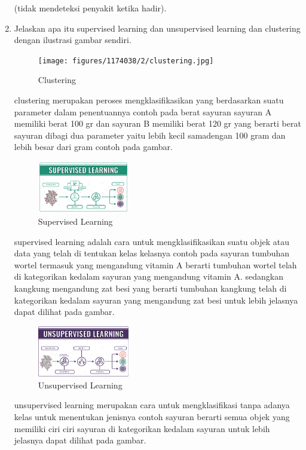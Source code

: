 \begin{enumerate}
	(tidak mendeteksi penyakit ketika hadir).
	\item Jelaskan apa itu supervised learning dan unsupervised learning dan clustering dengan ilustrasi gambar sendiri.
	\hfill\break
	\begin{figure}[H]
		\texttt{[image: figures/1174038/2/clustering.jpg]}
		\centering
		\caption{Clustering}
	\end{figure}
	\hfill\break
	clustering merupakan peroses mengklasifikasikan yang berdasarkan suatu parameter dalam penentuannya contoh pada berat sayuran sayuran A memiliki berat 100 gr dan sayuran B memiliki berat 120 gr yang berarti berat sayuran dibagi dua parameter yaitu lebih kecil samadengan 100 gram dan lebih besar dari gram contoh pada gambar.\par
		\begin{figure}[H]
		\includegraphics[width=4cm]{figures/1174038/2/supervised.png}
		\centering
		\caption{Supervised Learning}
	\end{figure}
	\hfill\break
	supervised learning adalah cara untuk mengklasifikasikan suatu objek atau data yang telah di tentukan kelas kelasnya contoh pada sayuran tumbuhan wortel termasuk yang mengandung vitamin A berarti tumbuhan wortel telah di kategorikan kedalam sayuran yang mengandung vitamin A. sedangkan kangkung mengandung zat besi yang berarti tumbuhan kangkung telah di kategorikan kedalam sayuran yang mengandung zat besi untuk lebih jelasnya dapat dilihat pada gambar.\par
		\begin{figure}[H]
		\includegraphics[width=4cm]{figures/1174038/2/unsupervised.png}
		\centering
		\caption{Unsupervised Learning}
	\end{figure}
	\hfill\break
	unsupervised learning merupakan cara untuk mengklasifikasi tanpa adanya kelas untuk menentukan jenisnya contoh sayuran berarti semua objek yang memiliki ciri ciri sayuran di kategorikan kedalam sayuran untuk lebih jelasnya dapat dilihat pada gambar.\par

\end{enumerate}
